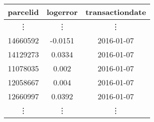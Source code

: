 \begin{center}
\begin{tabular}{|c|c|c|} \hline
parcelid & logerror & transactiondate \\ \hline
\vdots & \vdots & \vdots \\
14660592 & -0.0151 & 2016-01-07 \\
14129273 & 0.0334 & 2016-01-07 \\
11078035 & 0.002 & 2016-01-07 \\
12058667 & 0.004 & 2016-01-07 \\
12660997 & 0.0392 & 2016-01-07 \\
\vdots & \vdots & \vdots \\
\hline
\end{tabular}
\end{center}